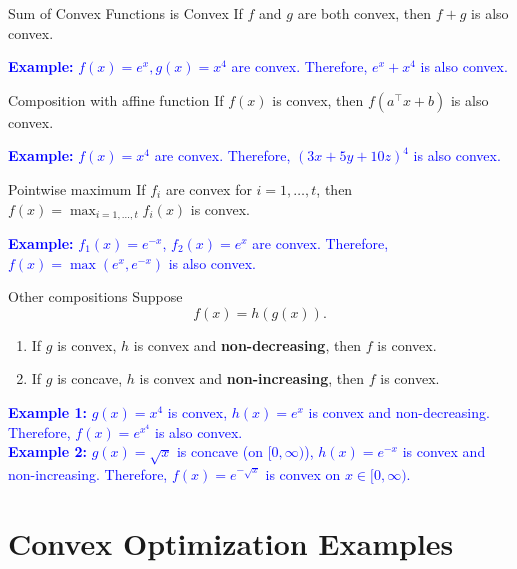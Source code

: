 \begin{general}{Sum of Convex Functions is Convex}{}
If $f$ and $g$ are both convex, then $f+g$ is also convex.

\textcolor{blue}{\textbf{Example: } $f(x) = e^x, g(x) = x^4$ are convex.  Therefore, $e^x + x^4$ is also convex.}
\end{general}

\begin{general}{Composition with affine function}{}
If $f(x)$ is convex, then $f(a^\top x + b)$ is also convex.

\textcolor{blue}{\textbf{Example: } $f(x) = x^4$ are convex.  Therefore, $(3x + 5y + 10z)^4$ is also convex.}
\end{general}

\begin{general}{Pointwise maximum}{}
If $f_i$ are convex for $i=1, \dots, t$, then $f(x) = \max_{i=1, \dots, t} f_i(x)$ is convex.

\textcolor{blue}{\textbf{Example: } $f_1(x) = e^{-x}$, $f_2(x) = e^{x}$ are convex.  Therefore, $f(x) = \max(e^x, e^{-x})$ is also convex.}
\end{general}

\begin{general}{Other compositions}{}
Suppose 
$$
f(x) = h(g(x)).
$$
\begin{enumerate}
\item If $g$ is convex, $h$ is convex and \textbf{non-decreasing}, then $f$ is convex.
\item If $g$ is concave, $h$ is convex and \textbf{non-increasing}, then $f$ is convex.
\end{enumerate}

\textcolor{blue}{\textbf{Example 1: } $g(x) = x^4$ is convex, $h(x) = e^{x}$ is convex and non-decreasing.  Therefore, $f(x) = e^{x^4}$ is also convex.}\\

\textcolor{blue}{\textbf{Example 2: } $g(x) = \sqrt{x}$ is concave (on $[0,\infty)$), $h(x) = e^{-x}$ is convex and non-increasing.  Therefore, $f(x) = e^{-\sqrt{x}}$ is convex on $x \in [0,\infty)$.}
\end{general}







\section{Convex Optimization Examples}
